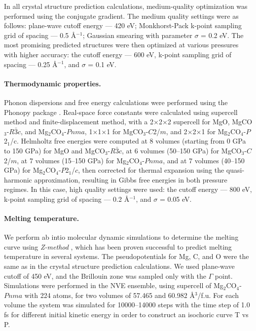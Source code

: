 \documentclass[a4paperm]{article}
\begin{document}
In all crystal structure prediction calculations, medium-quality optimization was performed using the conjugate gradient.
The medium quality settings were as follows: plane-wave cutoff energy --- 420 eV; Monkhorst-Pack k-point sampling grid of spacing --- 0.5 \AA$^{-1}$; Gaussian smearing with parameter $\sigma$ = 0.2 eV.
The most promising predicted structures were then optimized at various pressures with higher accuracy: the cutoff energy --- 600 eV, k-point sampling grid of spacing --- 0.25 \AA$^{-1}$, and $\sigma$ = 0.1 eV.

\paragraph{Thermodynamic properties.}
Phonon dispersions and free energy calculations were performed using the Phonopy package \cite{phonopy}.
Real-space force constants were calculated using supercell method and finite-displacement method, with a 2$\times$2$\times$2 supercell for MgO, MgCO$_3$-$R\bar{3}c$, and Mg$_2$CO$_4$-$Pnma$, 1$\times$1$\times$1 for MgCO$_3$-$C$2/$m$, and 2$\times$2$\times$1 for Mg$_2$CO$_4$-$P$2$_1$/c.
Helmholtz free energies were computed at 8 volumes (starting from 0 GPa to 150 GPa) for MgO and MgCO$_3$-$R\bar{3}c$, at 6 volumes (50--150 GPa) for MgCO$_3$-$C$2/$m$, at 7 volumes (15--150 GPa) for Mg$_2$CO$_4$-$Pnma$, and at 7 volumes (40--150 GPa) for Mg$_2$CO$_4$-$P$2$_1$/$c$, then corrected for thermal expansion using the quasi-harmonic approximation, resulting in Gibbs free energies in both pressure regimes.
In this case, high quality settings were used: the cutoff energy --- 800 eV, k-point sampling grid of spacing --- 0.2 \AA$^{-1}$, and $\sigma$ = 0.05 eV.

\paragraph{Melting temperature.}
We perform ab intio molecular dynamic simulations to determine the melting curve using {\it Z-method} \cite{z-method}, which has been proven successful to predict melting temperature in several systems.
The pseudopotentials for Mg, C, and O were the same as in the crystal structure prediction calculations.
We used plane-wave cutoff of 450 eV, and the Brillouin zone was sampled only with the $\Gamma$ point. Simulations were performed in the NVE ensemble, using supercell of Mg$_2$CO$_4$-$Pnma$ with 224 atoms, for two volumes of 57.465 and 60.982 \AA{$^3$}/f.u.
For each volume the system was simulated for 10000--14000 steps with the time step of 1.0 fs for different initial kinetic energy in order to construct an isochoric curve T vs P.
\end{document}
